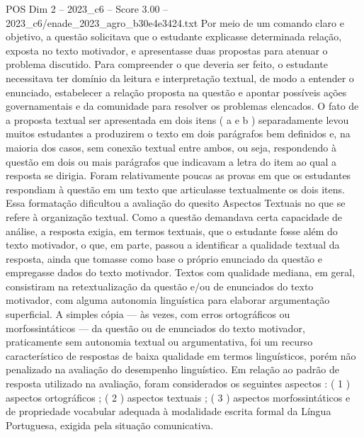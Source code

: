 \begin{textsample}{POS Dim 2 – 2023\_c6 – Score 3.00 – 2023\_c6/enade\_2023\_agro\_b30e4e3424.txt}
Por meio de um comando claro e objetivo, a questão solicitava que o estudante explicasse determinada relação, exposta no texto motivador, e apresentasse duas propostas para atenuar o problema discutido.
Para compreender o que deveria ser feito, o estudante necessitava ter domínio da leitura e interpretação textual, de modo a entender o enunciado, estabelecer a relação proposta na questão e apontar possíveis ações governamentais e da comunidade para resolver os problemas elencados.
O fato de a proposta textual ser apresentada em dois itens ( a e b ) separadamente levou muitos estudantes a produzirem o texto em dois parágrafos bem definidos e, na maioria dos casos, sem conexão textual entre ambos, ou seja, respondendo à questão em dois ou mais parágrafos que indicavam a letra do item ao qual a resposta se dirigia.
Foram relativamente poucas as provas em que os estudantes respondiam à questão em um texto que articulasse textualmente os dois itens.
Essa formatação dificultou a avaliação do quesito Aspectos Textuais no que se refere à organização textual.
Como a questão demandava certa capacidade de análise, a resposta exigia, em termos textuais, que o estudante fosse além do texto motivador, o que, em parte, passou a identificar a qualidade textual da resposta, ainda que tomasse como base o próprio enunciado da questão e empregasse dados do texto motivador.
Textos com qualidade mediana, em geral, consistiram na retextualização da questão e/ou de enunciados do texto motivador, com alguma autonomia linguística para elaborar argumentação superficial.
A simples cópia — às vezes, com erros ortográficos ou morfossintáticos — da questão ou de enunciados do texto motivador, praticamente sem autonomia textual ou argumentativa, foi um recurso característico de respostas de baixa qualidade em termos linguísticos, porém não penalizado na avaliação do desempenho linguístico.
Em relação ao padrão de resposta utilizado na avaliação, foram considerados os seguintes aspectos : ( 1 ) aspectos ortográficos ; ( 2 ) aspectos textuais ; ( 3 ) aspectos morfossintáticos e de propriedade vocabular adequada à modalidade escrita formal da Língua Portuguesa, exigida pela situação comunicativa.

\end{textsample}
